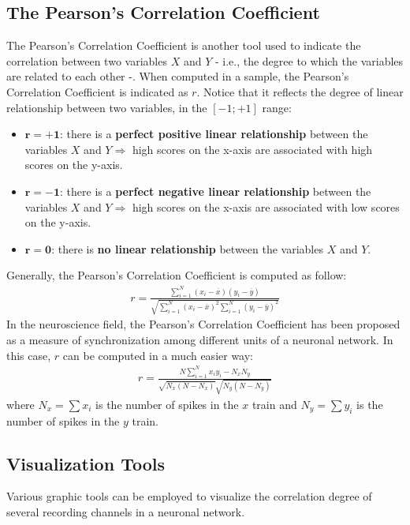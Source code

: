 \subsection{The Pearson's Correlation Coefficient}
The Pearson's Correlation Coefficient is another tool used to indicate the correlation
between two variables \(X\) and \(Y\) - i.e., the degree to which the variables are related
to each other -. When computed in a sample, the Pearson's Correlation Coefficient is
indicated as \(r\). Notice that it reflects the degree of linear relationship between two
variables, in the \([-1;+1]\) range:
\begin{itemize}
    \item \(\mathbf{r=+1}\): there is a \textbf{perfect positive linear
              relationship} between the variables \(X\) and \(Y\Rightarrow\) high scores on
          the x-axis are associated with high scores on the y-axis.
    \item \(\mathbf{r=-1}\): there is a \textbf{perfect negative linear
              relationship} between the variables \(X\) and \(Y\Rightarrow\) high scores on
          the x-axis are associated with low scores on the y-axis.
    \item \(\mathbf{r=0}\): there is \textbf{no linear
              relationship} between the variables \(X\) and \(Y\).
\end{itemize}
Generally, the Pearson's Correlation Coefficient is computed as follow:
\begin{align*}
    r=\frac{\sum_{i=1}^{N}(x_i-\overline{x})(y_i-\overline{y})}{\sqrt{\sum_{i=1}^{N}(x_i-\overline{x})^2\sum_{i=1}^{N}(y_i-\overline{y})^2}}
\end{align*}
In the neuroscience field, the Pearson's Correlation Coefficient has been proposed
as a measure of synchronization among different units of a neuronal network.
In this case, \(r\) can be computed in a much easier way:
\begin{align*}
    r=\frac{N\sum_{i=1}^{N}x_{i}y_{i}-N_{x}N_{y}}{\sqrt{N_{x}(N-N_{x})}\sqrt{N_{y}(N-N_{y})}}
\end{align*}
where \(N_x=\sum{x_i}\) is the number of spikes in the \(x\) train and \(N_y=\sum{y_i}\) is the number of spikes in the \(y\) train.

\subsection{Visualization Tools}
Various graphic tools can be employed to visualize the correlation degree of several
recording channels in a neuronal network.
